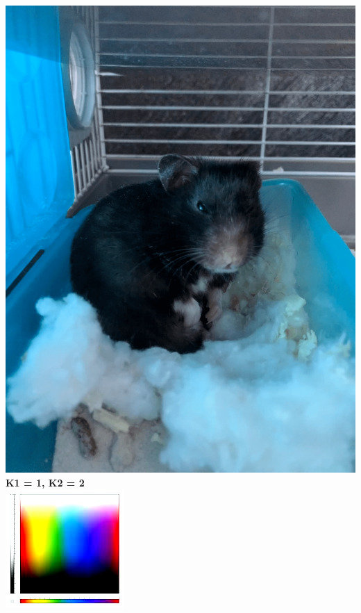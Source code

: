 \documentclass{article}
\begin{document}
\includegraphics[totalheight = 4cm]{3.png} \\
{\bf K1 = 1, K2 = 2\/}\\
\includegraphics[totalheight = 4cm]{112.png} \hspace{1.5cm}
\end{document}

